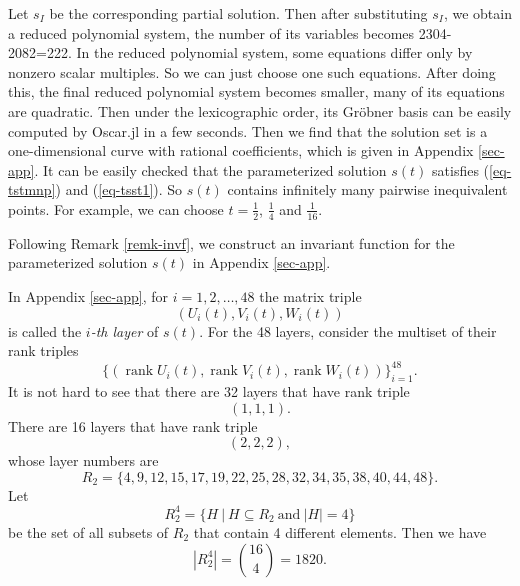 \documentclass[reqno]{amsart}
\theoremstyle{definition}
\numberwithin{equation}{section}
\theoremstyle{remark}
\begin{document}
Let $s_I$ be the corresponding partial solution. Then after substituting $s_I$, we obtain a reduced polynomial system, the number of its variables becomes 2304-2082=222. In the reduced polynomial system, some equations differ only by nonzero scalar multiples. So we can just choose one such equations. After doing this, the final reduced polynomial system becomes 
smaller, many of its equations are quadratic. Then
under the lexicographic order, its Gröbner basis can be easily computed by Oscar.jl \cite{Dec25} in a few seconds. Then we find that the solution set is a one-dimensional curve with rational coefficients, which is given in Appendix \ref{sec-app}. It can be easily checked that the parameterized solution $s(t)$ satisfies (\ref{eq-tstmnp}) and (\ref{eq-tsst1}). So 
$s(t)$ contains infinitely many pairwise inequivalent points. For example, we can choose $t=\frac{1}{2}$, $\frac{1}{4}$ and $\frac{1}{16}$. 

Following Remark \ref{remk-invf}, we construct an invariant function 
for the parameterized solution $s(t)$ in Appendix \ref{sec-app}.

In Appendix \ref{sec-app}, for $i=1,2,\ldots,48$ the matrix triple
$$(U_i(t),V_i(t),W_i(t))$$
is called the \emph{$i$-th layer} of $s(t)$.
For the 48 layers, consider the multiset of their rank triples
\begin{equation}\label{eq-rtriple}
\{(\operatorname{rank} U_i(t), \operatorname{rank} V_i(t),
              \operatorname{rank} W_i(t))\}_{i=1}^{48}.
\end{equation}
It is not hard to see that there are 32 layers that have rank triple 
\begin{equation}\label{eq-triple1}
(1,1,1).
\end{equation}
There are 16 layers that have rank triple 
\begin{equation}\label{eq-triple2}
(2,2,2),
\end{equation}
whose layer numbers are
$$R_2=\{4, 9, 12, 15, 17, 19, 22, 25,
      28, 32, 34, 35, 38, 40, 44, 48 \}.$$
Let
$$R_2^4=\{H~|~H\subseteq R_2~\text{and}~|H|=4\}$$
be the set of all subsets of $R_2$ that contain 4 different elements.
Then we have 
$$|R_2^4|=\binom{16}{4}=1820.$$
\end{document}
